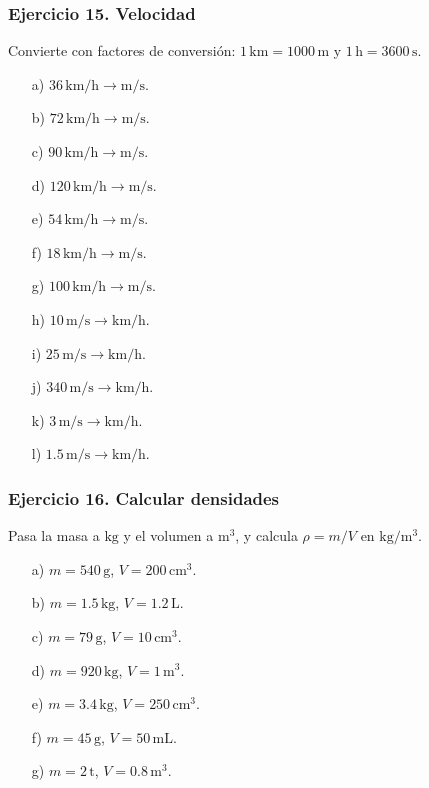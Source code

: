 \subsubsection*{Ejercicio 15. Velocidad}

Convierte con factores de conversión:
$1\,\mathrm{km}=1000\,\mathrm{m}$ y
$1\,\mathrm{h}=3600\,\mathrm{s}$.

\begin{enumerate}
    \item[a)] $36\,\mathrm{km/h}\rightarrow\mathrm{m/s}$.
    \item[b)] $72\,\mathrm{km/h}\rightarrow\mathrm{m/s}$.
    \item[c)] $90\,\mathrm{km/h}\rightarrow\mathrm{m/s}$.
    \item[d)] $120\,\mathrm{km/h}\rightarrow\mathrm{m/s}$.
    \item[e)] $54\,\mathrm{km/h}\rightarrow\mathrm{m/s}$.
    \item[f)] $18\,\mathrm{km/h}\rightarrow\mathrm{m/s}$.
    \item[g)] $100\,\mathrm{km/h}\rightarrow\mathrm{m/s}$.
    \item[h)] $10\,\mathrm{m/s}\rightarrow\mathrm{km/h}$.
    \item[i)] $25\,\mathrm{m/s}\rightarrow\mathrm{km/h}$.
    \item[j)] $340\,\mathrm{m/s}\rightarrow\mathrm{km/h}$.
    \item[k)] $3\,\mathrm{m/s}\rightarrow\mathrm{km/h}$.
    \item[l)] $1.5\,\mathrm{m/s}\rightarrow\mathrm{km/h}$.
\end{enumerate}

\subsubsection*{Ejercicio 16. Calcular densidades}

Pasa la masa a $\mathrm{kg}$ y el volumen a $\mathrm{m^3}$,
y calcula $\rho=m/V$ en $\mathrm{kg/m^3}$.

\begin{enumerate}
    \item[a)] $m=540\,\mathrm{g}$, $V=200\,\mathrm{cm^3}$.
    \item[b)] $m=1.5\,\mathrm{kg}$, $V=1.2\,\mathrm{L}$.
    \item[c)] $m=79\,\mathrm{g}$, $V=10\,\mathrm{cm^3}$.
    \item[d)] $m=920\,\mathrm{kg}$, $V=1\,\mathrm{m^3}$.
    \item[e)] $m=3.4\,\mathrm{kg}$, $V=250\,\mathrm{cm^3}$.
    \item[f)] $m=45\,\mathrm{g}$, $V=50\,\mathrm{mL}$.
    \item[g)] $m=2\,\mathrm{t}$, $V=0.8\,\mathrm{m^3}$.
\end{enumerate}

